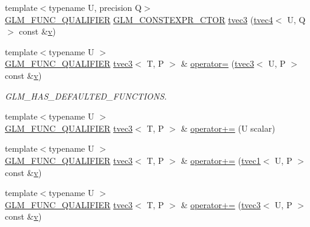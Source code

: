 \begin{DoxyCompactItemize}
\item 
{\footnotesize template$<$typename U, precision Q$>$ }\\\mbox{\hyperlink{setup_8hpp_a33fdea6f91c5f834105f7415e2a64407}{G\+L\+M\+\_\+\+F\+U\+N\+C\+\_\+\+Q\+U\+A\+L\+I\+F\+I\+ER}} \mbox{\hyperlink{setup_8hpp_ad34178a09666081abdb573c14d1f4a5a}{G\+L\+M\+\_\+\+C\+O\+N\+S\+T\+E\+X\+P\+R\+\_\+\+C\+T\+OR}} \mbox{\hyperlink{structglm_1_1tvec3_a2c796e51503a52b4ad1d3c1efd9e9a8e}{tvec3}} (\mbox{\hyperlink{structglm_1_1tvec4}{tvec4}}$<$ U, Q $>$ const \&\mbox{\hyperlink{glad_8h_a14cfbe2fc2234f5504618905b69d1e06}{v}})
\item 
{\footnotesize template$<$typename U $>$ }\\\mbox{\hyperlink{setup_8hpp_a33fdea6f91c5f834105f7415e2a64407}{G\+L\+M\+\_\+\+F\+U\+N\+C\+\_\+\+Q\+U\+A\+L\+I\+F\+I\+ER}} \mbox{\hyperlink{structglm_1_1tvec3}{tvec3}}$<$ T, P $>$ \& \mbox{\hyperlink{structglm_1_1tvec3_a4bcbc0805df40364733e741a859a6989}{operator=}} (\mbox{\hyperlink{structglm_1_1tvec3}{tvec3}}$<$ U, P $>$ const \&\mbox{\hyperlink{glad_8h_a14cfbe2fc2234f5504618905b69d1e06}{v}})
\begin{DoxyCompactList}\small\item\em G\+L\+M\+\_\+\+H\+A\+S\+\_\+\+D\+E\+F\+A\+U\+L\+T\+E\+D\+\_\+\+F\+U\+N\+C\+T\+I\+O\+NS. \end{DoxyCompactList}\item 
{\footnotesize template$<$typename U $>$ }\\\mbox{\hyperlink{setup_8hpp_a33fdea6f91c5f834105f7415e2a64407}{G\+L\+M\+\_\+\+F\+U\+N\+C\+\_\+\+Q\+U\+A\+L\+I\+F\+I\+ER}} \mbox{\hyperlink{structglm_1_1tvec3}{tvec3}}$<$ T, P $>$ \& \mbox{\hyperlink{structglm_1_1tvec3_a447912153d202969d9f5103af75d581d}{operator+=}} (U scalar)
\item 
{\footnotesize template$<$typename U $>$ }\\\mbox{\hyperlink{setup_8hpp_a33fdea6f91c5f834105f7415e2a64407}{G\+L\+M\+\_\+\+F\+U\+N\+C\+\_\+\+Q\+U\+A\+L\+I\+F\+I\+ER}} \mbox{\hyperlink{structglm_1_1tvec3}{tvec3}}$<$ T, P $>$ \& \mbox{\hyperlink{structglm_1_1tvec3_a26a3f96b23e7f5d59992c65a48dbb01d}{operator+=}} (\mbox{\hyperlink{structglm_1_1tvec1}{tvec1}}$<$ U, P $>$ const \&\mbox{\hyperlink{glad_8h_a14cfbe2fc2234f5504618905b69d1e06}{v}})
\item 
{\footnotesize template$<$typename U $>$ }\\\mbox{\hyperlink{setup_8hpp_a33fdea6f91c5f834105f7415e2a64407}{G\+L\+M\+\_\+\+F\+U\+N\+C\+\_\+\+Q\+U\+A\+L\+I\+F\+I\+ER}} \mbox{\hyperlink{structglm_1_1tvec3}{tvec3}}$<$ T, P $>$ \& \mbox{\hyperlink{structglm_1_1tvec3_a8c4047ef94643db0f346827041366fd2}{operator+=}} (\mbox{\hyperlink{structglm_1_1tvec3}{tvec3}}$<$ U, P $>$ const \&\mbox{\hyperlink{glad_8h_a14cfbe2fc2234f5504618905b69d1e06}{v}})

\end{DoxyCompactItemize}
